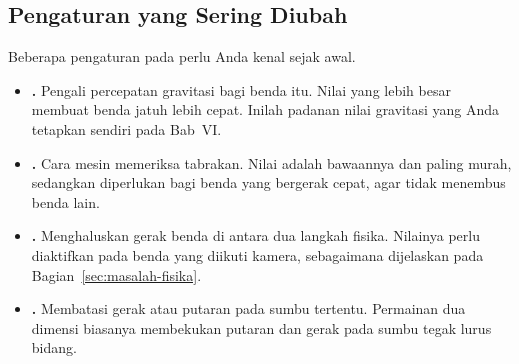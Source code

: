 \subsection{Pengaturan yang Sering Diubah}

Beberapa pengaturan pada  perlu Anda kenal sejak awal.

\begin{itemize}
  \item \textbf{.} Pengali percepatan gravitasi bagi
        benda itu. Nilai yang lebih besar membuat benda jatuh lebih cepat.
        Inilah padanan nilai gravitasi yang Anda tetapkan sendiri pada Bab~VI.
  \item \textbf{.} Cara mesin memeriksa tabrakan.
        Nilai  adalah bawaannya dan paling murah, sedangkan
         diperlukan bagi benda yang bergerak cepat, agar
        tidak menembus benda lain.
  \item \textbf{.} Menghaluskan gerak benda di antara dua
        langkah fisika. Nilainya perlu diaktifkan pada benda yang diikuti
        kamera, sebagaimana dijelaskan pada Bagian~\ref{sec:masalah-fisika}.
  \item \textbf{.} Membatasi gerak atau putaran pada
        sumbu tertentu. Permainan dua dimensi biasanya membekukan putaran dan
        gerak pada sumbu tegak lurus bidang.
\end{itemize}
